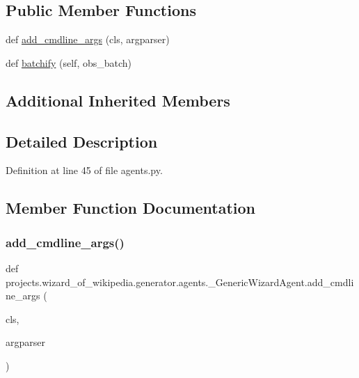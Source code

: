 \subsection*{Public Member Functions}
\begin{DoxyCompactItemize}
\item 
def \hyperlink{classprojects_1_1wizard__of__wikipedia_1_1generator_1_1agents_1_1__GenericWizardAgent_a09eb1c8f228b2d4fa8030466e86d0b59}{add\+\_\+cmdline\+\_\+args} (cls, argparser)
\item 
def \hyperlink{classprojects_1_1wizard__of__wikipedia_1_1generator_1_1agents_1_1__GenericWizardAgent_a898b6da1e93aa458966616f0208681fc}{batchify} (self, obs\+\_\+batch)
\end{DoxyCompactItemize}
\subsection*{Additional Inherited Members}


\subsection{Detailed Description}


Definition at line 45 of file agents.\+py.



\subsection{Member Function Documentation}
\mbox{\label{classprojects_1_1wizard__of__wikipedia_1_1generator_1_1agents_1_1__GenericWizardAgent_a09eb1c8f228b2d4fa8030466e86d0b59}} 
\subsubsection{\texorpdfstring{add\+\_\+cmdline\+\_\+args()}{add\_cmdline\_args()}}
{\footnotesize\ttfamily def projects.\+wizard\+\_\+of\+\_\+wikipedia.\+generator.\+agents.\+\_\+\+Generic\+Wizard\+Agent.\+add\+\_\+cmdline\+\_\+args (\begin{DoxyParamCaption}\item[{}]{cls,  }\item[{}]{argparser }\end{DoxyParamCaption})}



